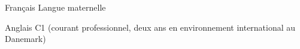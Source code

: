 


\begin{cvskills}


\cvskill
{Français}
{Langue maternelle}


\cvskill
{Anglais}
{C1 (courant professionnel, deux ans en environnement international au Danemark)}


\end{cvskills}
